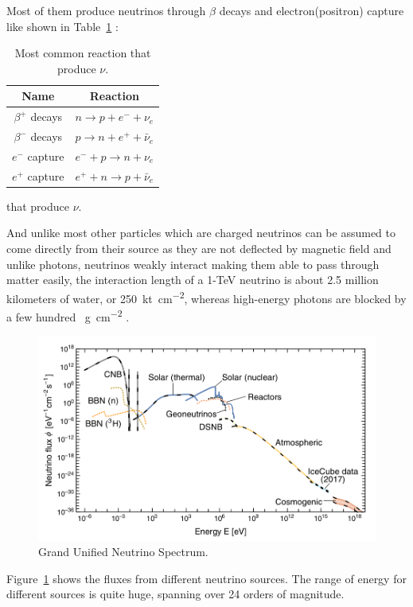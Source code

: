 Most of them produce neutrinos through $\beta$ decays and electron(positron) capture like shown in Table~\ref{tab:reaction}  :
\begin{table}[H]
	\centering
	\caption{Most common reaction that produce $\nu$.}
	\label{tab:reaction}
	\begin{tabular}{cc}
		\toprule
		Name & Reaction \\
		\midrule
		$\beta^+$ decays & $n\rightarrow p+e^-+\nu_e$ \\
		$\beta^-$ decays & $p\rightarrow n+e^++\bar\nu_e$ \\
		$e^-$ capture & $e^-+p\rightarrow n+\nu_e$ \\
		$e^+$ capture & $e^++n\rightarrow p+\bar\nu_e$ \\
		\bottomrule
	\end{tabular}
\end{table}
that produce $\nu$.

And unlike most other particles which are charged neutrinos can be assumed to come directly from their source as they are not deflected by magnetic field and unlike photons, neutrinos weakly interact making them able to pass through matter easily, the interaction length of a 1-TeV neutrino is about 2.5 million kilometers of water, or \SI{250}{\kilo\tonne\per\centi\meter\squared}, whereas high-energy photons are blocked by a few hundred \SI{}{\gram\per\centi\meter\squared} .
\begin{figure}[H]
	\centering
	\includegraphics[width=\textwidth]{assets/GUNS.png}
	\caption{Grand Unified Neutrino Spectrum.}
	\label{Graph:Guns}
\end{figure}

Figure~\ref{Graph:Guns}  shows the fluxes from different neutrino sources. The range of energy for different sources is quite huge, spanning over 24 orders of magnitude. 

